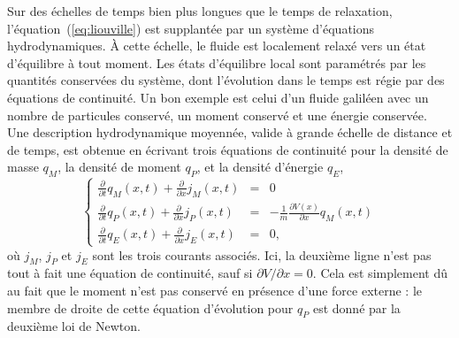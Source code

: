  
\vspace{0.5cm}


Sur des échelles de temps bien plus longues que le temps de relaxation, l'équation~(\ref{eq:liouville}) est supplantée par un système d'équations hydrodynamiques. À cette échelle, le fluide est localement relaxé vers un état d'équilibre à tout moment. Les états d'équilibre local sont paramétrés par les quantités conservées du système, dont l'évolution dans le temps est régie par des équations de continuité. Un bon exemple est celui d'un fluide galiléen avec un nombre de particules conservé, un moment conservé et une énergie conservée. Une description hydrodynamique moyennée, valide à grande échelle de distance et de temps, est obtenue en écrivant trois équations de continuité pour la densité de masse $q_M$, la densité de moment $q_P$, et la densité d'énergie $q_E$,
\begin{equation}
	\label{eq:continuity3}
	\left\{  \begin{array}{ccc}
		\frac{\partial}{\partial t} q_M (x,t)+ \frac{\partial}{\partial x}   j_{M} (x,t)  &=& 0 \\ 
		\frac{\partial}{\partial t}  q_P (x,t) + \frac{\partial}{\partial x}  j_{P} (x,t) &=& - \frac{1}{m}  \frac{\partial V(x)}{\partial x} q_M (x,t )  \\ 
		\frac{\partial}{\partial t}  q_E (x,t) +\frac{\partial}{\partial x}  j_{E} (x,t)   &=& 0  ,
	\end{array} \right.
\end{equation}
où $j_M$, $j_P$ et $j_E$ sont les trois courants associés. Ici, la deuxième ligne n'est pas tout à fait une équation de continuité, sauf si $\partial V/\partial x = 0$. Cela est simplement dû au fait que le moment n'est pas conservé en présence d'une force externe : le membre de droite de cette équation d'évolution pour $q_P$ est donné par la deuxième loi de Newton.

